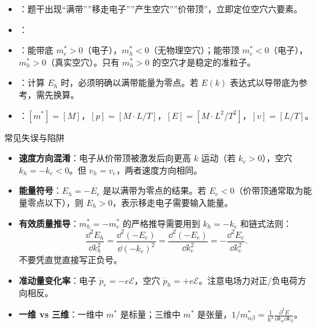 \begin{tipbox}[快速识别与解题技巧]
\begin{itemize}
    \item {}：题干出现``满带''''移走电子''''产生空穴''''价带顶''，立即定位空穴六要素。
    \item {}：
    \begin{center}
    \end{center}
    \item {}：能带底 $m_e^*>0$（电子），$m_h^*<0$（无物理空穴）；能带顶 $m_e^*<0$（电子），$m_h^*>0$（真实空穴）。只有 $m_h^*>0$ 的空穴才是稳定的准粒子。
    \item {}：计算 $E_h$ 时，必须明确以满带能量为零点。若 $E(k)$ 表达式以导带底为参考，需先换算。
    \item {}：$[m^*]=[M]$，$[p]=[M\cdot L/T]$，$[E]=[M\cdot L^2/T^2]$，$[v]=[L/T]$。
\end{itemize}
\end{tipbox}

\begin{errorbox}{常见失误与陷阱}
\begin{itemize}
    \item \textbf{速度方向混淆}：电子从价带顶被激发后向更高 $k$ 运动（若 $k_e>0$），空穴 $k_h=-k_e<0$。但 $v_h=v_e$，两者速度方向相同。
    \item \textbf{能量符号}：$E_h=-E_e$ 是以满带为零点的结果。若 $E_e<0$（价带顶通常取为能量零点以下），则 $E_h>0$，表示移走电子需要输入能量。
    \item \textbf{有效质量推导}：$m_h^*=-m_e^*$ 的严格推导需要用到 $k_h=-k_e$ 和链式法则：
    \[
    \frac{\dd^2E_h}{\dd k_h^2}=\frac{\dd^2(-E_e)}{\dd(-k_e)^2}=\frac{\dd^2(-E_e)}{\dd k_e^2}=-\frac{\dd^2E_e}{\dd k_e^2}.
    \]
    不要凭直觉直接写正负号。
    \item \textbf{准动量变化率}：电子 $\dot{p}_e=-e\mathcal{E}$，空穴 $\dot{p}_h=+e\mathcal{E}$。注意电场力对正/负电荷方向相反。
    \item \textbf{一维 vs 三维}：一维中 $m^*$ 是标量；三维中 $m^*$ 是张量，$1/m^*_{\alpha\beta}=\frac{1}{\hbar^2}\frac{\partial^2E}{\partial k_\alpha\partial k_\beta}$。
\end{itemize}
\end{errorbox}

